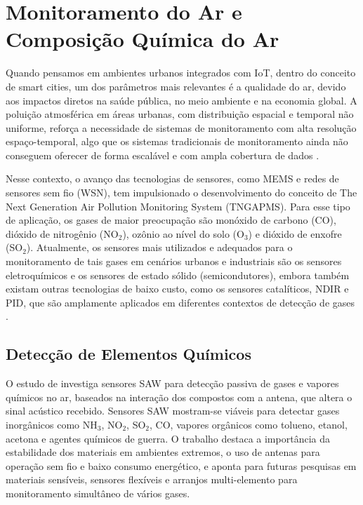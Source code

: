 \section{Monitoramento do Ar e Composição Química do Ar}
Quando pensamos em ambientes urbanos integrados com IoT, dentro do conceito de smart cities, um dos parâmetros mais relevantes é a qualidade do ar, devido aos impactos diretos na saúde pública, no meio ambiente e na economia global. A poluição atmosférica em áreas urbanas, com distribuição espacial e temporal não uniforme, reforça a necessidade de sistemas de monitoramento com alta resolução espaço-temporal, algo que os sistemas tradicionais de monitoramento ainda não conseguem oferecer de forma escalável e com ampla cobertura de dados \cite{yi_2015_a}.

Nesse contexto, o avanço das tecnologias de sensores, como MEMS e redes de sensores sem fio (WSN), tem impulsionado o desenvolvimento do conceito de The Next Generation Air Pollution Monitoring System (TNGAPMS). Para esse tipo de aplicação, os gases de maior preocupação são monóxido de carbono (CO), dióxido de nitrogênio (NO$_2$), ozônio ao nível do solo (O$_3$) e dióxido de enxofre (SO$_2$). Atualmente, os sensores mais utilizados e adequados para o monitoramento de tais gases em cenários urbanos e industriais são os sensores eletroquímicos e os sensores de estado sólido (semicondutores), embora também existam outras tecnologias de baixo custo, como os sensores catalíticos, NDIR e PID, que são amplamente aplicados em diferentes contextos de detecção de gases \cite{yi_2015_a}.

\subsection{Detecção de Elementos Químicos}

O estudo de \textcite{devkota_2017_saw} investiga sensores SAW para detecção passiva de gases e vapores químicos no ar, baseados na interação dos compostos com a antena, que altera o sinal acústico recebido. Sensores SAW mostram-se viáveis para detectar gases inorgânicos como NH$_3$, NO$_2$, SO$_2$, CO, vapores orgânicos como tolueno, etanol, acetona e agentes químicos de guerra.
O trabalho destaca a importância da estabilidade dos materiais em ambientes extremos, o uso de antenas para operação sem fio e baixo consumo energético, e aponta para futuras pesquisas em materiais sensíveis, sensores flexíveis e arranjos multi-elemento para monitoramento simultâneo de vários gases.


